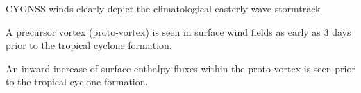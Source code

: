 \documentclass[draft]{agujournal2019}
\begin{document}





\begin{keypoints}
\item CYGNSS winds clearly depict the climatological easterly wave stormtrack

\item  A precursor vortex (proto-vortex) is seen in surface wind fields as early as 3 days prior to the tropical cyclone formation.

\item An inward increase of surface enthalpy fluxes within the proto-vortex is seen prior to the tropical cyclone formation. 



\end{keypoints}

%
%

%
%
\end{document}
